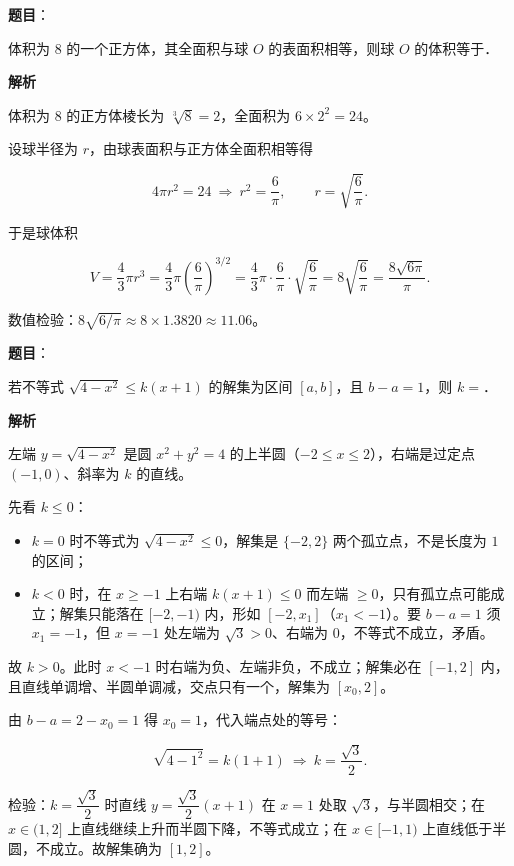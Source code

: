 \begin{answer}

\textbf{题目}：

体积为 $8$ 的一个正方体，其全面积与球 $O$ 的表面积相等，则球 $O$ 的体积等于\gkblank{}．

\textbf{解析}

体积为 $8$ 的正方体棱长为 $\sqrt[3]{8}=2$，全面积为 $6\times2^2=24$。

设球半径为 $r$，由球表面积与正方体全面积相等得

\nopagebreak[4]
\[4\pi r^2=24\ \Longrightarrow\ r^2=\frac6\pi,\qquad r=\sqrt{\frac6\pi}.\]

于是球体积

\nopagebreak[4]
\[V=\frac43\pi r^3=\frac43\pi\left(\frac6\pi\right)^{3/2}=\frac43\pi\cdot\frac6\pi\cdot\sqrt{\frac6\pi}=8\sqrt{\frac6\pi}=\frac{8\sqrt{6\pi}}{\pi}.\]

数值检验：$8\sqrt{6/\pi}\approx8\times1.3820\approx11.06$。


\end{answer}
\begin{answer}

\textbf{题目}：

若不等式 $\sqrt{4-x^2}\leqslant k(x+1)$ 的解集为区间 $[a,b]$，且 $b-a=1$，则 $k=$\gkblank{}．

\textbf{解析}

左端 $y=\sqrt{4-x^2}$ 是圆 $x^2+y^2=4$ 的上半圆（$-2\leqslant x\leqslant2$），右端是过定点 $(-1,0)$、斜率为 $k$ 的直线。

先看 $k\leqslant0$：

\begin{itemize}
\item $k=0$ 时不等式为 $\sqrt{4-x^2}\leqslant0$，解集是 $\{-2,2\}$ 两个孤立点，不是长度为 $1$ 的区间；
\item $k<0$ 时，在 $x\geqslant-1$ 上右端 $k(x+1)\leqslant0$ 而左端 $\geqslant0$，只有孤立点可能成立；解集只能落在 $[-2,-1)$ 内，形如 $[-2,x_1]$（$x_1<-1$）。要 $b-a=1$ 须 $x_1=-1$，但 $x=-1$ 处左端为 $\sqrt3>0$、右端为 $0$，不等式不成立，矛盾。
\end{itemize}

故 $k>0$。此时 $x<-1$ 时右端为负、左端非负，不成立；解集必在 $[-1,2]$ 内，且直线单调增、半圆单调减，交点只有一个，解集为 $[x_0,2]$。

由 $b-a=2-x_0=1$ 得 $x_0=1$，代入端点处的等号：

\nopagebreak[4]
\[\sqrt{4-1^2}=k(1+1)\ \Longrightarrow\ k=\frac{\sqrt3}{2}.\]

检验：$k=\dfrac{\sqrt3}{2}$ 时直线 $y=\dfrac{\sqrt3}{2}(x+1)$ 在 $x=1$ 处取 $\sqrt3$，与半圆相交；在 $x\in(1,2]$ 上直线继续上升而半圆下降，不等式成立；在 $x\in[-1,1)$ 上直线低于半圆，不成立。故解集确为 $[1,2]$。


\end{answer}

